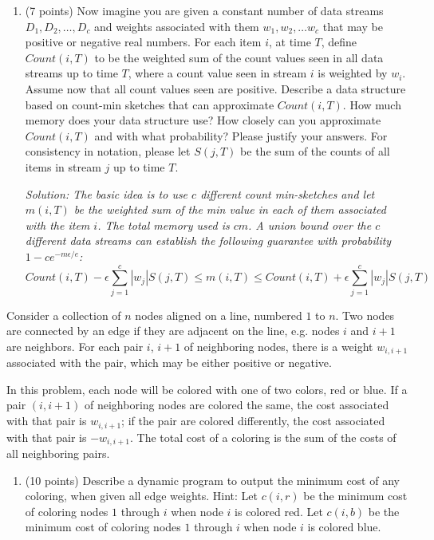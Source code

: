 \documentclass[11pt]{article}
\newcommand{\ans}[1]{\emph{Solution: #1}}
\begin{document}
\begin{enumerate}
\begin{enumerate}
\pagebreak

\item  (7 points) Now imagine you are given a constant number of data streams $D_{1}, D_{2}, \ldots, D_{c}$ and weights associated with them $w_{1}, w_{2}, \ldots w_{c}$ that may be positive or negative real numbers.  For each item $i$, at time $T$, define $Count(i,T)$ to be the weighted sum of the count values seen in all data streams up to time $T$, where a count value seen in stream $i$ is weighted by $w_{i}$.  Assume now that all count values seen are positive.  Describe a data structure based on count-min sketches that can approximate $Count(i,T)$.  How much memory does your data structure use? How closely can you approximate $Count(i,T)$ and with what probability?  Please justify your answers.  For consistency in notation, please let $S(j,T)$ be the sum of the counts of all items in stream $j$ up to time $T$.

\ans{The basic idea is to use $c$ different count min-sketches and let $m(i,T)$ be the weighted sum of the min value in each of them associated with the item $i$.  The total memory used is $cm$.  A union bound over the $c$ different data streams can establish the following guarantee with probability $1-c e^{-m\epsilon/e}$:
 $$ Count(i,T) - \epsilon \sum_{j=1}^{c} |w_{j}| S(j,T) \leq m(i,T) \leq Count(i,T) + \epsilon \sum_{j=1}^{c} |w_{j}| S(j,T) $$}


\end{enumerate}
 
 
 

Consider a collection of $n$ nodes aligned on a line, numbered $1$ to $n$.  Two nodes are connected by an edge if they are adjacent on the line, e.g. nodes $i$ and $i+1$ are neighbors.  For each pair $i$, $i+1$ of neighboring nodes, there is a weight $w_{i,i+1}$ associated with the pair, which may be either positive or negative.

In this problem, each node will be colored with one of two colors, red or blue.  If a pair $(i,i+1)$ of neighboring nodes are colored the same, the cost associated with that pair is $w_{i,i+1}$; if the pair are colored differently, the cost associated with that pair is $-w_{i,i+1}$.   The total cost of a coloring is the sum of the costs of all neighboring pairs.

\begin{enumerate}

\item (10 points) Describe a dynamic program to output the minimum cost of any coloring, when given all edge weights.  Hint: Let $c(i,r)$ be the minimum cost of coloring nodes $1$ through $i$ when node $i$ is colored red.  Let $c(i,b)$ be the minimum cost of coloring nodes $1$ through $i$ when node $i$ is colored blue.


\end{enumerate}
\end{enumerate}
\end{document}
